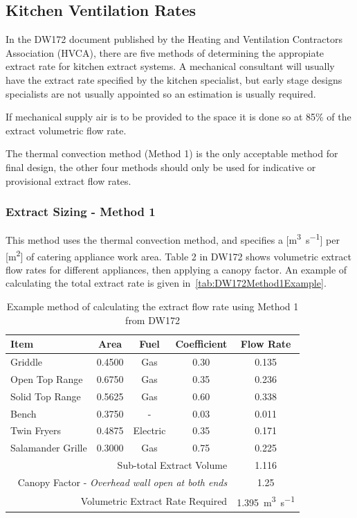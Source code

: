 \subsection{Kitchen Ventilation Rates}
\label{ssec:KitchenVentRates}

In the DW172 document published by the Heating and Ventilation Contractors Association (HVCA), there are five methods of determining the appropiate extract rate for kitchen extract systems.  A mechanical consultant will usually have the extract rate specified by the kitchen specialist, but early stage designs specialists are not usually appointed so an estimation is usually required.

If mechanical supply air is to be provided to the space it is done so at 85\% of the extract volumetric flow rate.

The thermal convection method (Method 1) is the only acceptable method for final design, the other four methods should only be used for indicative or provisional extract flow rates.

\subsubsection{Extract Sizing - Method 1}

This method uses the thermal convection method, and specifies a [\si{\cubic\metre\per\second}] per [\si{\square\metre}] of catering appliance work area.  Table 2 in DW172 shows volumetric extract flow rates for different appliances, then applying a canopy factor.  An example of calculating the total extract rate is given in~\autoref{tab:DW172Method1Example}.

\begin{table}[H]
\centering
\begin{tabular}{lcccc}
\hline
Item & Area & Fuel & Coefficient & Flow Rate\\
\hline
Griddle & 0.4500 & Gas & 0.30 & 0.135\\
Open Top Range & 0.6750 & Gas & 0.35 & 0.236\\
Solid Top Range & 0.5625 & Gas & 0.60 & 0.338\\
Bench & 0.3750 & - & 0.03 & 0.011\\
Twin Fryers & 0.4875 & Electric & 0.35 & 0.171\\
Salamander Grille & 0.3000 & Gas & 0.75 & 0.225\\
\hline
\multicolumn{4}{r}{Sub-total Extract Volume} & 1.116\\
\multicolumn{4}{r}{Canopy Factor - \textit{Overhead wall open at both ends}} & 1.25\\
\hline
\multicolumn{4}{r}{Volumetric Extract Rate Required} & 1.395~\si{\cubic\metre\per\second}\\
\hline
\end{tabular}
\caption{Example method of calculating the extract flow rate using Method 1 from DW172}
\label{tab:DW172Method1Example}
\end{table}

